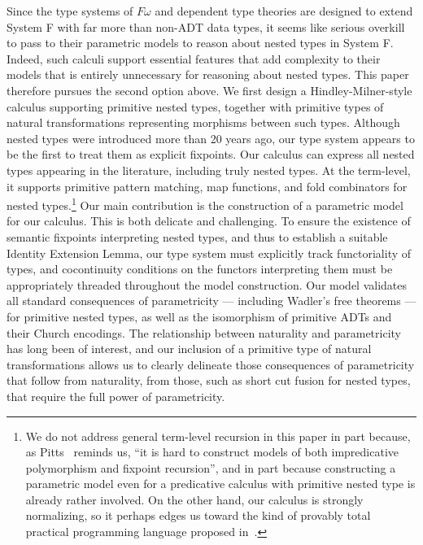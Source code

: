 \documentclass[runningheads]{llncs}
\begin{document}
Since the type systems of $F\omega$ and dependent type theories are
designed to extend System F with far more than non-ADT data types, it
seems like serious overkill to pass to their parametric models to
reason about nested types in System F. Indeed, such calculi support
essential features that add complexity to their models that is
entirely unnecessary for reasoning about nested types. This paper
therefore pursues the second option above.  We first design a
Hindley-Milner-style calculus supporting primitive nested types,
together with primitive types of natural transformations representing
morphisms between such types.  Although nested types were introduced
more than 20 years ago, our type system appears to be the first to
treat them as explicit fixpoints. Our calculus can express all nested
types appearing in the literature, including truly nested types.  At
the term-level, it supports primitive pattern matching, map functions,
and fold combinators for nested types.\footnote{We do not address
  general term-level recursion in this paper in part because, as
  Pitts~\cite{pit00} reminds us, ``it is hard to construct models of
  both impredicative polymorphism and fixpoint recursion'', and in
  part because constructing a parametric model even for a predicative
  calculus with primitive nested type is already rather involved.
  On the other hand, our calculus is strongly normalizing, so it
  perhaps edges us toward the kind of provably total practical
  programming language proposed in~\cite{wad89}.}  Our main
contribution is the construction of a parametric model for our
calculus. This is both delicate and challenging. To ensure the
existence of semantic fixpoints interpreting nested types, and thus to
establish a suitable Identity Extension Lemma, our type system must
explicitly track functoriality of types, and cocontinuity conditions
on the functors interpreting them must be appropriately threaded
throughout the model construction. Our model validates all standard
consequences of parametricity --- including Wadler's free theorems ---
for primitive nested types, as well as the isomorphism of primitive
ADTs and their Church encodings. The relationship between naturality
and parametricity has long been of interest, and our inclusion of a
primitive type of natural transformations allows us to clearly
delineate those consequences of parametricity
that follow from naturality,
from those, such as short cut fusion for nested types, that
require the full power of parametricity.
\end{document}
